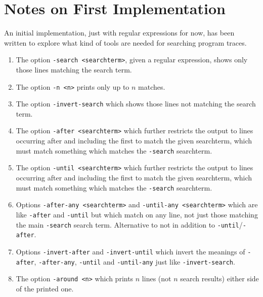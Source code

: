\documentclass[10pt]{article}
\begin{document}
\section{Notes on First Implementation}

An initial implementation, just with regular expressions for now, has been written to explore what kind of tools are needed for searching program traces.

\begin{enumerate}
\item The option \texttt{-search <searchterm>}, given a regular expression, shows only those lines matching the search term.
\item The option \texttt{-n <n>} prints only up to $n$ matches.
\item The option \texttt{-invert-search} which shows those lines not matching the search term.
\item The option \texttt{-after <searchterm>} which further restricts the output to lines occurring after and including the first to match the given searchterm, which must match something which matches the \texttt{-search} searchterm.
\item The option \texttt{-until <searchterm>} which further restricts the output to lines occurring after and including the first to match the given searchterm, which must match something which matches the \texttt{-search} searchterm. 
\item Options \texttt{-after-any <searchterm>} and \texttt{-until-any <searchterm>} which are like \texttt{-after} and \texttt{-until} but which match on any line, not just those matching the main \texttt{-search} search term. Alternative to not in addition to \texttt{-until}/\texttt{-after}.
\item Options \texttt{-invert-after} and \texttt{-invert-until} which invert the meanings of \texttt{-after}, \texttt{-after-any}, \texttt{-until} and \texttt{-until-any} just like \texttt{-invert-search}.
\item The option \texttt{-around <n>} which prints $n$ lines (not $n$ search results) either side of the printed one.
\end{enumerate}
\end{document}
